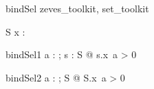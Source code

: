 \begin{zsection}
 \SECTION bindSel \parents zeves\_toolkit, set\_toolkit
\end{zsection}

\begin{schema}{S}
 x : \nat \fun \nat
\end{schema}

\begin{theorem}{bindSel1}
\forall a : \nat; s : S @ s.x~a > 0
\end{theorem}


\begin{theorem}{bindSel2}
  \forall a : \nat; S @ \theta S.x~a > 0
\end{theorem}
